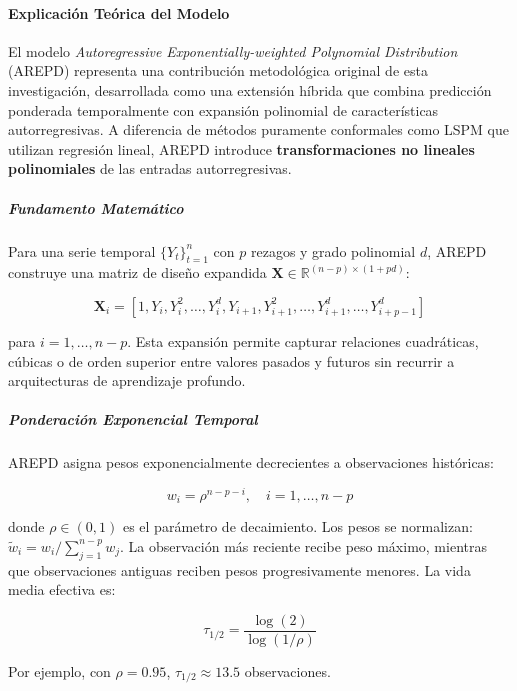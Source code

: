 \paragraph{Explicación Teórica del Modelo}

El modelo \textit{Autoregressive Exponentially-weighted Polynomial Distribution} (AREPD) representa una contribución metodológica original de esta investigación, desarrollada como una extensión híbrida que combina predicción ponderada temporalmente con expansión polinomial de características autorregresivas. A diferencia de métodos puramente conformales como LSPM que utilizan regresión lineal, AREPD introduce \textbf{transformaciones no lineales polinomiales} de las entradas autorregresivas.

\subparagraph{Fundamento Matemático}

Para una serie temporal $\{Y_t\}_{t=1}^{n}$ con $p$ rezagos y grado polinomial $d$, AREPD construye una matriz de diseño expandida $\mathbf{X} \in \mathbb{R}^{(n-p) \times (1+pd)}$:

\begin{equation}
\mathbf{X}_i = \left[1, Y_{i}, Y_{i}^2, \ldots, Y_{i}^d, Y_{i+1}, Y_{i+1}^2, \ldots, Y_{i+1}^d, \ldots, Y_{i+p-1}^d\right]
\end{equation}

para $i = 1, \ldots, n-p$. Esta expansión permite capturar relaciones cuadráticas, cúbicas o de orden superior entre valores pasados y futuros sin recurrir a arquitecturas de aprendizaje profundo.

\subparagraph{Ponderación Exponencial Temporal}

AREPD asigna pesos exponencialmente decrecientes a observaciones históricas:

\begin{equation}
w_i = \rho^{n-p-i}, \quad i = 1, \ldots, n-p
\end{equation}

donde $\rho \in (0, 1)$ es el parámetro de decaimiento. Los pesos se normalizan: $\tilde{w}_i = w_i / \sum_{j=1}^{n-p} w_j$. La observación más reciente recibe peso máximo, mientras que observaciones antiguas reciben pesos progresivamente menores. La vida media efectiva es:

\begin{equation}
\tau_{1/2} = \frac{\log(2)}{\log(1/\rho)}
\end{equation}

Por ejemplo, con $\rho = 0.95$, $\tau_{1/2} \approx 13.5$ observaciones.


